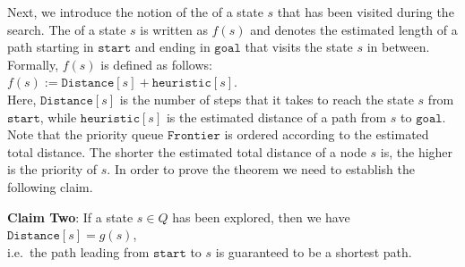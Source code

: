 Next, we introduce the notion of the  of a state $s$ that has been visited
during the search.  The  of a state $s$ is written as $f(s)$ and denotes the
estimated length of a path starting in $\texttt{start}$ and ending in $\texttt{goal}$ that visits the state $s$ in
between.  Formally, $f(s)$ is defined as follows:
\\[0.2cm]
\hspace*{1.3cm}
$f(s) := \texttt{Distance}[s] + \texttt{heuristic}[s]$.
\\[0.2cm]
Here, $\texttt{Distance}[s]$ is the number of steps that it takes to reach the state $s$ from $\texttt{start}$,
while $\texttt{heuristic}[s]$ is the estimated distance of a path from $s$ to $\texttt{goal}$.  Note that
the priority queue $\texttt{Frontier}$ is ordered according to the estimated total distance.
The shorter the estimated total distance of a node $s$ is, the higher is the priority of $s$. 
In order to prove the theorem we need to establish the following claim.
\vspace*{0.2cm}

\noindent
\textbf{Claim Two}: If a state $s \in Q$ has been explored, then we have
\\[0.2cm]
\hspace*{1.3cm}
$\texttt{Distance}[s] = g(s)$,
\\[0.2cm]
i.e.~the path leading from $\texttt{start}$ to $s$ is guaranteed to be a shortest path.
\vspace*{0.2cm}

